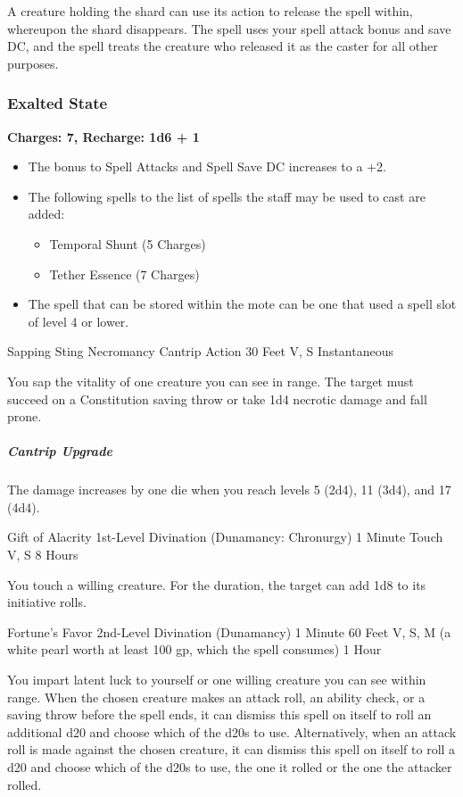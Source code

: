 {\begin{itemize}
	A creature holding the shard can use its action to release the spell within, whereupon the shard disappears. The spell uses your spell attack bonus and save DC, and the spell treats the creature who released it as the caster for all other purposes.
\end{itemize}
\subsubsection*{Exalted State}
\textbf{Charges: 7, Recharge: 1d6 + 1}
\begin{itemize}
	\item The bonus to Spell Attacks and Spell Save DC increases to a +2.
	\item The following spells to the list of spells the staff may be used to cast are added:
	\begin{itemize}
		\item Temporal Shunt (5 Charges)
		\item Tether Essence (7 Charges)
	\end{itemize}
	\item The spell that can be stored within the mote can be one that used a spell slot of level 4 or lower.
\end{itemize}}
\vfill\eject
\DndSpellHeader
  {Sapping Sting}
  {Necromancy Cantrip}
  {Action}
  {30 Feet}
  {V, S}
  {Instantaneous}

\noindent You sap the vitality of one creature you can see in range. The target must succeed on a Constitution saving throw or take 1d4 necrotic damage and fall prone.

\subparagraph*{Cantrip Upgrade} The damage increases by one die when you reach levels 5 (2d4), 11 (3d4), and 17 (4d4).

\DndSpellHeader
  {Gift of Alacrity}
  {1st-Level Divination (Dunamancy: Chronurgy)}
  {1 Minute}
  {Touch}
  {V, S}
  {8 Hours}

\noindent You touch a willing creature. For the duration, the target can add 1d8 to its initiative rolls.

\DndSpellHeader
  {Fortune's Favor}
  {2nd-Level Divination (Dunamancy)}
  {1 Minute}
  {60 Feet}
  {V, S, M (a white pearl worth at least 100 gp, which the spell consumes)}
  {1 Hour}

\noindent You impart latent luck to yourself or one willing creature you can see within range. When the chosen creature makes an attack roll, an ability check, or a saving throw before the spell ends, it can dismiss this spell on itself to roll an additional d20 and choose which of the d20s to use. Alternatively, when an attack roll is made against the chosen creature, it can dismiss this spell on itself to roll a d20 and choose which of the d20s to use, the one it rolled or the one the attacker rolled.

